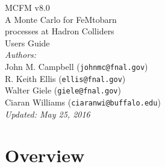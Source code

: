 \documentclass[12pt]{article}
\begin{document}
\def\GeV{\mbox{GeV}}
\def\cteqten{\mbox{1007.2241 [hep-ph]}}
\def\cteqsixsixm{\mbox{0802.0007 [hep-ph]}}
\def\cteqsixonem{\mbox{hep-ph/0303013}}
\def\cteqsix{\mbox{hep-ph/0201195}}
\def\cteqfive{\mbox{hep-ph/9903282}}
\def\cteqfour{\mbox{hep-ph/9606399}}
\def\cteqthree{\mbox{MSU-HEP/41024}}
\def\mrstff{\mbox{hep-ph/0603143}}
\def\mrstohtwo{\mbox{hep-ph/0211080}}
\def\mrstohtwofirst{\mbox{hep-ph/0201127}}
\def\mrstohone{\mbox{hep-ph/0110215}}
\def\mrsninenine{\mbox{hep-ph/9907231}}
\def\mrsnineeight{\mbox{hep-ph/9803445}}
\def\mrsninesix{\mbox{PLB387 (1996) 419}}
\def\mrsninefive{\mbox{PLB354 (1995) 155}}
\def\hmrs{\mbox{Durham DTP-90-04}}
\def\mstwoheight{\mbox{0901.0002 [hep-ph]}}
\def\MCFM{{\tt MCFM }}
\def\pow{{\lower.12ex\hbox{\texttt{\char`\^}}}}

\thispagestyle{empty}
\vspace*{3cm}
\begin{center}
{\Huge MCFM v8.0} \\
\vspace*{0.5cm}
\Large{A Monte Carlo for FeMtobarn} \\
\Large{processes at Hadron Colliders} \\
\vspace*{1.5cm}
{\huge Users Guide} \\
\vspace*{4cm}
{\it Authors:} \\
\vspace*{0.2cm}
John M. Campbell ({\tt johnmc@fnal.gov}) \\
R. Keith Ellis ({\tt ellis@fnal.gov}) \\
Walter Giele ({\tt giele@fnal.gov}) \\
Ciaran Williams ({\tt ciaranwi@buffalo.edu}) \\
\vspace*{1.5cm}
{\it \small Updated: May 25, 2016}
\end{center}

\newpage

\tableofcontents

\newpage

\section{Overview}
\end{document}
